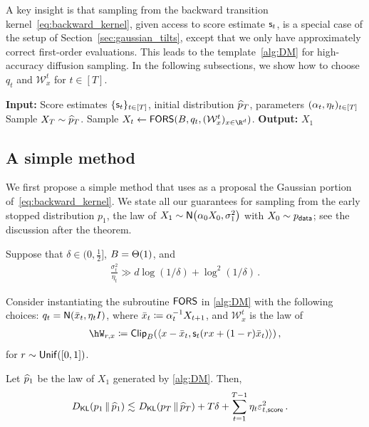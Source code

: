 








A key insight is that sampling from the backward transition kernel~\eqref{eq:backward_kernel}, given access to score estimate $\mathsf{s}_t$, is a special case of the setup of Section~\ref{sec:gaussian_tilts}, except that we only have approximately correct first-order evaluations.
This leads to the template~\cref{alg:DM} for high-accuracy diffusion sampling.
In the following subsections, we show how to choose $q_t$ and $\mathcal W_x^t$ for $t\in [T]$.

\renewcommand{\xr}[1]{X_{#1}}
\begin{algorithm}[H]
  \caption{Backward diffusion sampling}\label{alg:DM}
\begin{algorithmic}
\STATE \textbf{Input:} Score estimates $\{\mathsf{s}_t\}_{t\in[T]}$, initial distribution $\widehat{p}_T$, parameters $(\alpha_t,\eta_t)_{t\in [T]}$
\STATE Sample $\xr{T}\sim \phat_T$.
\STATE Sample $\xr{t}\leftarrow \AlgWSC(B, q_t, (\mathcal W^t_x)_{x\in\R^d})$.
\ENDFOR
\STATE \textbf{Output:} $\xr{1}$
\end{algorithmic}
\end{algorithm}








\subsection{A simple method}\label{ssec:diffusion-simple}


We first propose a simple method that uses as a proposal the Gaussian portion of~\eqref{eq:backward_kernel}.
We state all our guarantees for sampling from the early stopped distribution $p_1$, the law of $X_1 \sim \normal{\alpha_0 X_0, \sigma_1^2}$ with $X_0 \sim p_{\mathsf{data}}$; see the discussion after the theorem.

\begin{theorem}\label{thm:DM-clip-simple}
Suppose that $\delta\in(0,\frac12]$, $B=\Theta(1)$, and
\begin{align}\label{eq:DM-simple-eta}
    \frac{\sigma_t^2}{\eta_{t}} \gg d\log(1/\delta)+\log^2(1/\delta)\,.
\end{align}

Consider instantiating the subroutine
$\textsf{FORS}$ in \cref{alg:DM} with the following choices: $q_t = \mathsf{N}(\bar x_t, \eta_t I)$, where $\bar x_t \deq \alpha_t^{-1} \xr{t+1}$, and $\mathcal W_x^t$ is the law of
\begin{align*}
    \hW_{r,x} \deq \pclip{\langle x-\bar x_t, \scf_t(rx+(1-r)\bar x_t)\rangle}\,,
\end{align*}
for $r\sim \mathsf{Unif}([0,1])$.

Let $\widehat{p}_1$ be the law of $\xr{1}$ generated by \cref{alg:DM}. Then,
\begin{align*}
\kl{p_1}{\phat_1}\leqsim&~ \kl{p_T}{\phat_T}+T\delta+ \sum_{t=1}^{T-1} \eta_t \epssct^2\,.
\end{align*}
\end{theorem}

